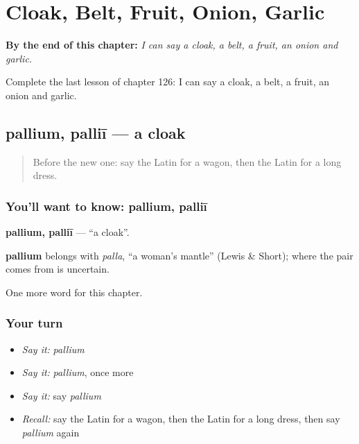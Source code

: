 
\chapter{Cloak, Belt, Fruit, Onion, Garlic}
\label{ch:la-cloak-belt-fruit-onion-garlic}

\begin{chapteropening}
\textbf{By the end of this chapter:} \emph{I can say a cloak, a belt, a fruit, an onion and garlic.}

Complete the last lesson of chapter 126: I can say a cloak, a belt, a fruit, an onion and garlic.
\end{chapteropening}

\section[pallium, palliī]{pallium, palliī — a cloak}

\label{lesson:LA-C126-pallium}



\begin{quote}
Before the new one: say the Latin for a wagon, then the Latin for a long dress.
\end{quote}

\subsection*{You'll want to know: pallium, palliī}
\textbf{pallium, palliī} — \textquotedblleft{}a cloak\textquotedblright{}.

\begin{cousinweb}
\textbf{pallium} belongs with \emph{palla}, \textquotedblleft{}a woman's mantle\textquotedblright{} (Lewis \& Short); where the pair comes from is uncertain.
\end{cousinweb}

\begin{grammarlens}[title={What you've built}]
One more word for this chapter.
\end{grammarlens}

\subsection*{Your turn}
\begin{itemize}
\raggedright
  \item \emph{Say it:} \emph{pallium}
  \item \emph{Say it:} \emph{pallium}, once more
  \item \emph{Say it:} say \emph{pallium}
  \item \emph{Recall:} say the Latin for a wagon, then the Latin for a long dress, then say \emph{pallium} again
\end{itemize}

